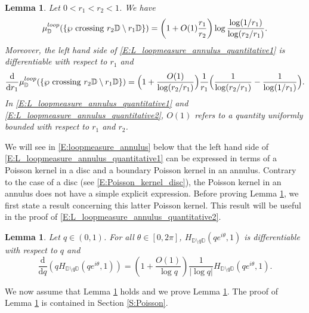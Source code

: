 \documentclass[11pt]{article}
\newtheorem{lemma}[theorem]{Lemma}
\theoremstyle{remark}
\newcommand{\D}{\mathbb{D}}
\renewcommand{\d}{\mathrm{d}}
\def \loopmeasure{\mu^{\rm loop}}
\numberwithin{equation}{section}
\begin{document}
\begin{lemma}\label{L:loopmeasure_annulus_quantitative}
Let $0<r_1<r_2<1$. We have
\begin{equation}
\label{E:L_loopmeasure_annulus_quantitative1}
\loopmeasure_\D ( \{ \wp \mathrm{~crossing~} r_2 \D \setminus r_1 \D \} ) = \left( 1 + O(1)\frac{r_1}{r_2} \right) \log \frac{\log (1/r_1)}{\log (r_2/r_1)}.
\end{equation}
Moreover, the left hand side of \eqref{E:L_loopmeasure_annulus_quantitative1} is differentiable with respect to $r_1$ and
\begin{equation}
\label{E:L_loopmeasure_annulus_quantitative2}
\frac{\d}{\d r_1} \loopmeasure_\D ( \{ \wp \mathrm{~crossing~} r_2 \D \setminus r_1 \D \} ) = \Big( 1 + \frac{O(1)}{\log(r_2/r_1)} \Big) \frac{1}{r_1} \Big( \frac{1}{\log(r_2/r_1)} - \frac{1}{\log(1/r_1)} \Big).
\end{equation}
In \eqref{E:L_loopmeasure_annulus_quantitative1} and \eqref{E:L_loopmeasure_annulus_quantitative2}, $O(1)$ refers to a quantity uniformly bounded with respect to $r_1$ and $r_2$.
\end{lemma}


We will see in \eqref{E:loopmeasure_annulus} below that the left hand side of \eqref{E:L_loopmeasure_annulus_quantitative1} can be expressed in terms of a Poisson kernel in a disc and a boundary Poisson kernel in an annulus. Contrary to the case of a disc (see \eqref{E:Poisson_kernel_disc}), the Poisson kernel in an annulus does not have a simple explicit expression. Before proving Lemma \ref{L:loopmeasure_annulus_quantitative}, we first state a result concerning this latter Poisson kernel. This result will be useful in the proof of \eqref{E:L_loopmeasure_annulus_quantitative2}.


\begin{lemma}\label{L:Poisson_kernel}
Let $q \in (0,1)$. For all $\theta \in [0,2 \pi]$, $H_{\D \setminus q \D}(qe^{i\theta},1)$ is differentiable with respect to $q$ and
\begin{equation}
\frac{\d}{\d q} \left( q H_{\D \setminus q \D}(qe^{i\theta},1) \right) = \left( 1 + \frac{O(1)}{\log q} \right) \frac{1}{|\log q|} H_{\D \setminus q \D}(qe^{i\theta},1).
\end{equation}
\end{lemma}


We now assume that Lemma \ref{L:Poisson_kernel} holds and we prove Lemma \ref{L:loopmeasure_annulus_quantitative}. The proof of Lemma \ref{L:Poisson_kernel} is contained in Section \ref{S:Poisson}.
\end{document}
